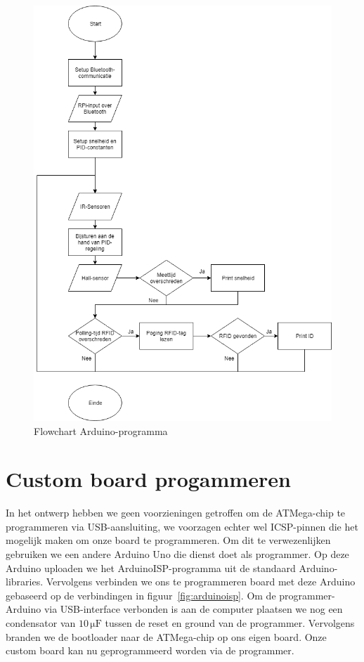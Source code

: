 \begin{figure}[H]
	\centering
	\includegraphics[height=\textheight]{arduinoflowchart.png}
	\caption{Flowchart Arduino-programma\label{fig:arduinoflowchart}}
	\end{figure}

\section{Custom board progammeren}
In het ontwerp hebben we geen voorzieningen getroffen om de ATMega-chip te programmeren via USB-aansluiting, we voorzagen echter wel ICSP-pinnen die het mogelijk maken om onze board te programmeren. Om dit te verwezenlijken gebruiken we een andere Arduino Uno die dienst doet als programmer. Op deze Arduino uploaden we het ArduinoISP-programma uit de standaard Arduino-libraries. Vervolgens verbinden we ons te programmeren board met deze Arduino gebaseerd op de verbindingen in figuur~\vref{fig:arduinoisp}. Om de programmer-Arduino via USB-interface verbonden is aan de computer plaatsen we nog een condensator van $10\,\mathrm{\mu F}$ tussen de reset en ground van de programmer. Vervolgens branden we de bootloader naar de ATMega-chip op ons eigen board. Onze custom board kan nu geprogrammeerd worden via de programmer.

